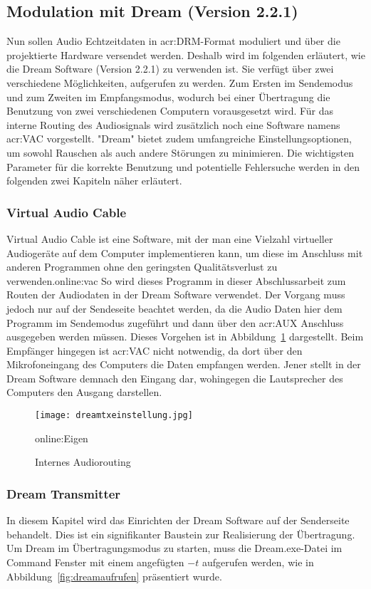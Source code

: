 \subsection{Modulation mit Dream (Version 2.2.1)}
\label{subsec:dream}
Nun sollen Audio Echtzeitdaten in \gls{acr:DRM}-Format moduliert und über die projektierte Hardware versendet werden. Deshalb wird im folgenden erläutert, wie die Dream Software (Version 2.2.1) zu verwenden ist. Sie verfügt über zwei verschiedene Möglichkeiten, aufgerufen zu werden. Zum Ersten im Sendemodus und zum Zweiten im Empfangsmodus, wodurch bei einer Übertragung die Benutzung von zwei verschiedenen Computern vorausgesetzt wird. Für das interne Routing des Audiosignals wird zusätzlich noch eine Software namens \gls{acr:VAC} vorgestellt. "Dream" bietet zudem umfangreiche Einstellungsoptionen, um sowohl Rauschen als auch andere Störungen zu minimieren. Die wichtigsten Parameter für die korrekte Benutzung und potentielle Fehlersuche werden in den folgenden zwei Kapiteln näher erläutert.

\subsubsection{Virtual Audio Cable}
\label{subsubsec:routing}
Virtual Audio Cable ist eine Software, mit der man eine Vielzahl virtueller Audiogeräte auf dem Computer implementieren kann, um diese im Anschluss mit anderen Programmen ohne den geringsten Qualitätsverlust zu verwenden.\gls{online:vac} So wird dieses Programm in dieser Abschlussarbeit zum Routen der Audiodaten in der Dream Software verwendet. Der Vorgang muss jedoch nur auf der Sendeseite beachtet werden, da die Audio Daten hier dem Programm im Sendemodus zugeführt und dann über den \gls{acr:AUX} Anschluss ausgegeben werden müssen. Dieses Vorgehen ist in Abbildung~\ref{fig:dreamtxeinstellung} dargestellt. Beim Empfänger hingegen ist \gls{acr:VAC} nicht notwendig, da dort über den Mikrofoneingang des Computers die Daten empfangen werden. Jener stellt in der Dream Software demnach den Eingang dar, wohingegen die Lautsprecher des Computers den Ausgang darstellen.

\begin{figure}[H]
	\centering
	\texttt{[image: dreamtxeinstellung.jpg]}
	\caption[Internes Audiorouting]{Internes Audiorouting} \gls{online:Eigen}
	\label{fig:dreamtxeinstellung}
\end{figure}


\subsubsection{Dream Transmitter}
\label{subsubsec:dreamtx}
In diesem Kapitel wird das Einrichten der Dream Software auf der Senderseite behandelt. Dies ist ein signifikanter Baustein zur Realisierung der Übertragung. Um Dream im Übertragungsmodus zu starten, muss die Dream.exe-Datei im Command Fenster mit einem angefügten $-t$ aufgerufen werden, wie in Abbildung~\ref{fig:dreamaufrufen} präsentiert wurde.


